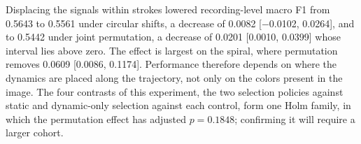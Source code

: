 Displacing the signals within strokes lowered recording-level macro F1 from 0.5643 to 0.5561 under circular shifts, a decrease of 0.0082 [$-$0.0102, 0.0264], and to 0.5442 under joint permutation, a decrease of 0.0201 [0.0010, 0.0399] whose interval lies above zero. The effect is largest on the spiral, where permutation removes 0.0609 [0.0086, 0.1174]. Performance therefore depends on where the dynamics are placed along the trajectory, not only on the colors present in the image. The four contrasts of this experiment, the two selection policies against static and dynamic-only selection against each control, form one Holm family, in which the permutation effect has adjusted $p=0.1848$; confirming it will require a larger cohort.
